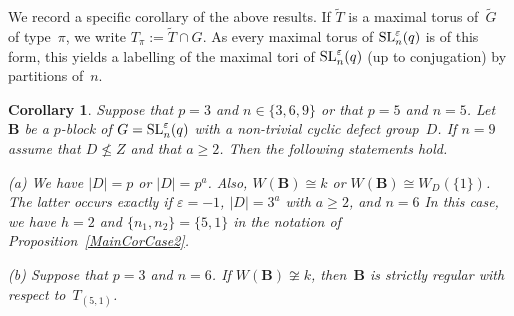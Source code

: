 \documentclass[12pt]{amsart}
\newcommand{\bB}{{\mathbf{B}}}
\def\SL{ \text{\rm SL} }
\newtheorem{cor}[thm]{Corollary}
\theoremstyle{theorem}
\theoremstyle{definition}
\theoremstyle{remark}
\begin{document}
We record a specific corollary of the above results. 
If $\tilde{T}$ is a maximal torus of~$\tilde{G}$ of type~$\pi$,
we write $T_{\pi} := \tilde{T} \cap G$. As every maximal torus of
$\SL_n^\varepsilon(q)$ is of this form, this yields a labelling of
the maximal tori of $\SL_n^\varepsilon(q)$ (up to conjugation) by 
partitions of~$n$.

\begin{cor}
\label{SpecialCases}
Suppose that $p = 3$ and $n \in \{ 3, 6, 9 \}$ or that $p = 5$ and $n = 5$. 
Let~$\bB$ be a $p$-block of 
$G = \SL_n^\varepsilon( q )$ with a non-trivial cyclic defect group~$D$. 
If $n = 9$ assume that $D \not\leq Z$ and that $a \geq 2$. 
Then the following statements hold.

{\rm (a)} We have $|D| = p$ or $|D| = p^a$. Also, 
$W( \bB ) \cong k$ or $W( \bB ) \cong W_D( \{ 1 \} )$. The latter occurs
exactly if $\varepsilon = -1$, $|D| = 3^a$ with $a \geq 2$, and $n = 6$
In this case, we have $h = 2$ and $\{ n_1 , n_2 \} = \{ 5, 1 \}$
in the notation of {\rm Proposition~\ref{MainCorCase2}}.

{\rm (b)} Suppose that $p = 3$ and $n = 6$. If $W( \bB ) \not\cong k$, 
then~$\bB$ is strictly regular with respect to~$T_{(5,1)}$.
\end{cor}
\end{document}
